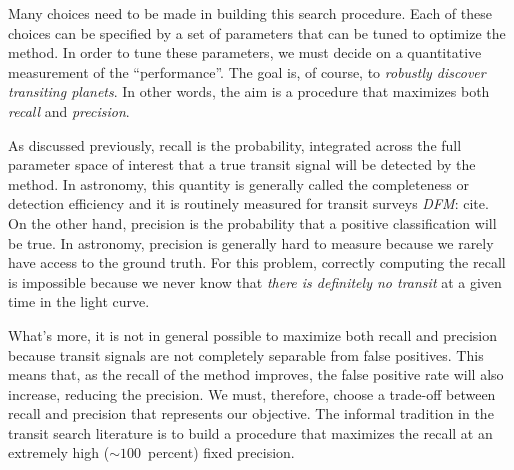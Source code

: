 \documentclass[12pt,preprint]{aastex}
\newcommand{\todo}[3]{{\color{#2}\emph{#1}: #3}}
\newcommand{\dfmtodo}[1]{\todo{DFM}{red}{#1}}
\begin{document}
Many choices need to be made in building this search procedure.
Each of these choices can be specified by a set of parameters that can be
tuned to optimize the method.
In order to tune these parameters, we must decide on a quantitative
measurement of the ``performance''.
The goal is, of course, to \emph{robustly discover transiting planets}.
In other words, the aim is a procedure that maximizes both \emph{recall} and
\emph{precision}.

As discussed previously, recall is the probability, integrated across the full
parameter space of interest that a true transit signal will be detected by the
method.
In astronomy, this quantity is generally called the completeness or detection
efficiency and it is routinely measured for transit surveys \dfmtodo{cite}.
On the other hand, precision is the probability that a positive classification
will be true.
In astronomy, precision is generally hard to measure because we rarely have
access to the ground truth.
For this problem, correctly computing the recall is impossible because we
never know that \emph{there is definitely no transit} at a given time in the
light curve.

What's more, it is not in general possible to maximize both recall and
precision because transit signals are not completely separable from false
positives.
This means that, as the recall of the method improves, the false positive rate
will also increase, reducing the precision.
We must, therefore, choose a trade-off between recall and precision that
represents our objective.
The informal tradition in the transit search literature is to build a
procedure that maximizes the recall at an extremely high ($\sim 100$~percent)
fixed precision.
\end{document}
